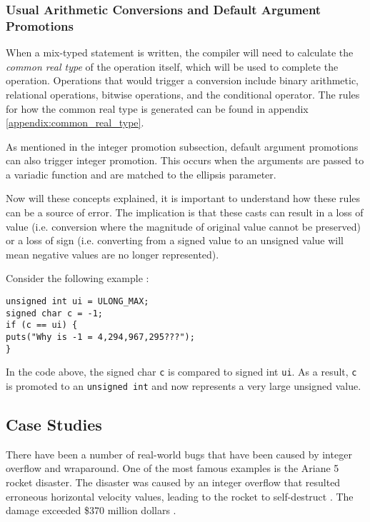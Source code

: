 \subsubsection{Usual Arithmetic Conversions and Default Argument Promotions}

When a mix-typed statement is written, the compiler will need to calculate the \textit{common real type} of the operation itself, which will be used to complete the operation. Operations that would trigger a conversion include binary arithmetic, relational operations, bitwise operations, and the conditional operator. The rules for how the common real type is generated can be found in appendix \ref{appendix:common_real_type}.


As mentioned in the integer promotion subsection, default argument promotions can also trigger integer promotion. This occurs when the arguments are passed to a variadic function and are matched to the ellipsis parameter.

Now will these concepts explained, it is important to understand how these rules can be a source of error. The implication is that these casts can result in a loss of value (i.e. conversion where the magnitude of original value cannot be preserved) or a loss of sign (i.e. converting from a signed value to an unsigned value will mean negative values are no longer represented).

Consider the following example \cite{secure_coding} :

\begin{center}
\parbox{0.9\linewidth}{
\texttt{unsigned int ui = ULONG\_MAX;\\
signed char c = -1;\\
if (c == ui) \{\\
\hspace*{2em}puts("Why is -1 = 4,294,967,295???");\\
\}
}}
\end{center}

In the code above, the signed char \texttt{c} is compared to signed int \texttt{ui}. As a result, \texttt{c} is promoted to an \texttt{unsigned int} and now represents a very large unsigned value.

\subsection{Case Studies}

There have been a number of real-world bugs that have been caused by integer overflow and wraparound. One of the most famous examples is the Ariane 5 rocket disaster. The disaster was caused by an integer overflow that resulted erroneous horizontal velocity values, leading to the rocket to self-destruct \cite{a5}. The damage exceeded \$370 million dollars \cite{a5_cost}.

